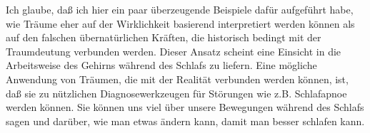 Ich glaube, daß ich hier ein paar überzeugende Beispiele dafür aufgeführt habe, wie Träume eher auf der Wirklichkeit basierend interpretiert werden können als auf den falschen übernatürlichen Kräften, die historisch bedingt mit der Traumdeutung verbunden werden.
Dieser Ansatz scheint eine Einsicht in die Arbeitsweise des Gehirns während des Schlafs zu liefern.
Eine mögliche Anwendung von Träumen, die mit der Realität verbunden werden können, ist, daß sie zu nützlichen Diagnosewerkzeugen für Störungen wie z.B. Schlafapnoe werden können.
Sie können uns viel über unsere Bewegungen während des Schlafs sagen und darüber, wie man etwas ändern kann, damit man besser schlafen kann.



